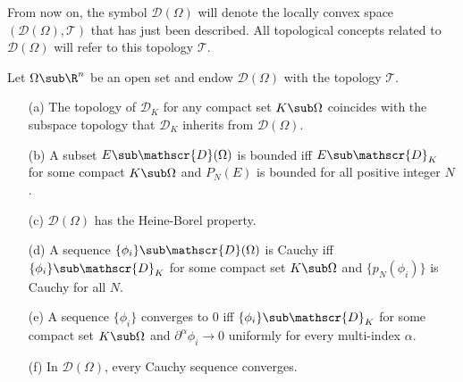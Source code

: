 From now on, the symbol $\mathscr{D}(\Omega)$ will denote the locally convex space $(\mathscr{D}(\Omega),\mathcal{T})$ that has just been described. All topological concepts related to $\mathscr{D}(\Omega)$ will refer to this topology $\mathcal{T}$.
\begin{theorem}\label{test function topology prop}
Let $\Omega\sub\R^n$ be an open set and endow $\mathscr{D}(\Omega)$ with the topology $\mathcal{T}$.
\begin{itemize}
\item[(a)] The topology of $\mathscr{D}_K$ for any compact set $K\sub\Omega$ coincides with the subspace topology that $\mathscr{D}_K$ inherits from $\mathscr{D}(\Omega)$.
\item[(b)] A subset $E\sub\mathscr{D}(\Omega)$ is bounded iff $E\sub\mathscr{D}_K$ for some compact $K\sub\Omega$ and $P_N(E)$ is bounded for all positive integer $N$.
\item[(c)] $\mathscr{D}(\Omega)$ has the Heine-Borel property.
\item[(d)] A sequence $\{\phi_i\}\sub\mathscr{D}(\Omega)$ is Cauchy iff $\{\phi_i\}\sub\mathscr{D}_K$ for some compact set $K\sub\Omega$ and $\{p_N(\phi_i)\}$ is Cauchy for all $N$.
\item[(e)] A sequence $\{\phi_i\}$ converges to $0$ iff $\{\phi_i\}\sub\mathscr{D}_K$ for some compact set $K\sub\Omega$ and $\partial^\alpha\phi_i\to 0$ uniformly for every multi-index $\alpha$.
\item[(f)] In $\mathscr{D}(\Omega)$, every Cauchy sequence converges.
\end{itemize}
\end{theorem}
